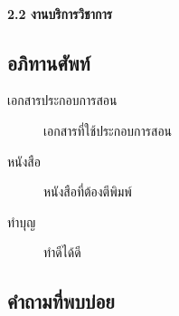 \documentclass[a4paper,12pt,english]{sphinxmanual}
\begin{document}
\paragraph{2.2 งานบริการวิชาการ}
\label{\detokenize{5etc:id4}}

\subsection{อภิทานศัพท์}
\label{\detokenize{glossary:id1}}\label{\detokenize{glossary::doc}}\begin{description}
\item[{เอกสารประกอบการสอน\label{\detokenize{glossary:term-0}}}] \leavevmode
เอกสารที่ใช้ประกอบการสอน

\item[{หนังสือ\label{\detokenize{glossary:term-1}}}] \leavevmode
หนังสือที่ต้องตีพิมพ์

\item[{ทำบุญ\label{\detokenize{glossary:term-2}}}] \leavevmode
ทำดีได้ดี

\end{description}


\subsection{คำถามที่พบบ่อย}
\label{\detokenize{faq:id1}}\label{\detokenize{faq::doc}}


\renewcommand{\indexname}{Index}
\printindex
\end{document}
